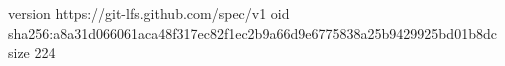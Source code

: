version https://git-lfs.github.com/spec/v1
oid sha256:a8a31d066061aca48f317ec82f1ec2b9a66d9e6775838a25b9429925bd01b8dc
size 224
